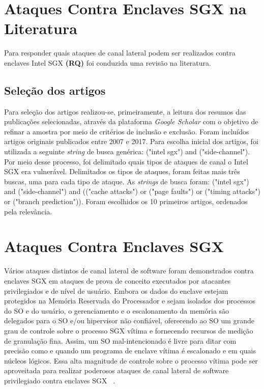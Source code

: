 \documentclass[review]{elsarticle}
\begin{document}
\section{Ataques Contra Enclaves SGX na Literatura}

Para responder quais ataques de canal lateral podem ser realizados contra enclaves Intel SGX \textbf{(RQ)} foi conduzida uma revisão na literatura.

\subsection {Seleção dos artigos}

Para seleção dos artigos realizou-se, primeiramente, a leitura dos resumos das publicações selecionadas, através da plataforma \emph{Google Scholar} com o objetivo de refinar a amostra por meio de critérios de inclusão e exclusão. Foram incluídos artigos originais publicados entre 2007 e 2017. Para escolha inicial dos artigos, foi utilizada a seguinte \emph{string} de busca genérica: ("intel sgx") and ("side-channel"). Por meio desse processo, foi delimitado quais tipos de ataques de canal o Intel SGX era vulnerável. Delimitados os tipos de ataques, foram feitas mais três buscas, uma para cada tipo de ataque. As \emph{strings} de busca foram: ("intel sgx") and ("side-channel") and (("cache attacks") or ("page faults") or ("timing attacks") or ("branch prediction")). Foram escolhidos os 10 primeiros artigos, ordenados pela relevância.

\section{Ataques Contra Enclaves SGX}

Vários ataques distintos de canal lateral de software foram demonstrados contra enclaves SGX em ataques de prova de conceito executados por atacantes privilegiados e de nível de usuário. Embora os dados do enclave estejam protegidos na Memória Reservada do Processador e sejam isolados dos processos do SO e do usuário, o gerenciamento e o escalonamento da memória são delegados para o SO e/ou hipervisor não confiável, oferecendo ao SO um grande grau de controle sobre o processo SGX vítima e fornecendo recursos de medição de granulação fina. Assim, um SO mal-intencionado é livre para ditar com precisão como e quando um programa de enclave vítima é escalonado e em quais núcleos lógicos. Essa alta magnitude de controle sobre o processo vítima pode ser aproveitada para realizar poderosos ataques de canal lateral de software privilegiado contra enclaves SGX ~\cite{costan_intel_2016}.
\end{document}
